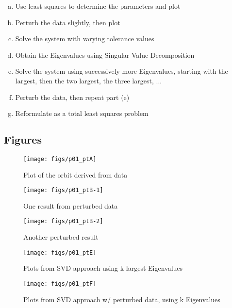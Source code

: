 \documentclass[paper=a4, fontsize=11pt]{scrartcl}
\numberwithin{equation}{section}		%
\numberwithin{figure}{section}			%
\numberwithin{table}{section}				%
\begin{document}
\begin{enumerate}[(a)]
	\item Use least squares to determine the parameters and plot  \vspace{-2mm}
	\item Perturb the data slightly, then plot \vspace{-2mm}
	\item Solve the system with varying tolerance values \vspace{-2mm}
	\item Obtain the Eigenvalues using Singular Value Decomposition \vspace{-2mm}
	\item Solve the system using successively more Eigenvalues, starting with the largest, then the two largest, the three largest, ... \vspace{-2mm}
	\item Perturb the data, then repeat part (e) \vspace{-2mm}
	\item Reformulate as a total least squares problem \vspace{-2mm}
\end{enumerate}

\vspace{4mm}
\subsection{Figures}

\begin{figure}[!hbt]
		\texttt{[image: figs/p01\_ptA]}
		\caption{Plot of the orbit derived from data}
		\label{fig:3.5-a}
	\endminipage\hfill
		\texttt{[image: figs/p01\_ptB-1]}
		\caption{One result from perturbed data}
		\label{fig:p3.5-b1}
	\endminipage\hfill
		\texttt{[image: figs/p01\_ptB-2]}
		\caption{Another perturbed result}
		\label{fig:p3.5-b2}
	\endminipage\hfill
\end{figure}
\begin{figure}[!hbt]
		\texttt{[image: figs/p01\_ptE]}
		\caption{Plots from SVD approach using k largest Eigenvalues}
		\label{fig:3.5-e}
	\endminipage\hfill
		\texttt{[image: figs/p01\_ptF]}
		\caption{Plots from SVD approach w/ perturbed data, using k Eigenvalues}
		\label{fig:p3.5-f}
	\endminipage\hfill
\end{figure}
\end{document}
